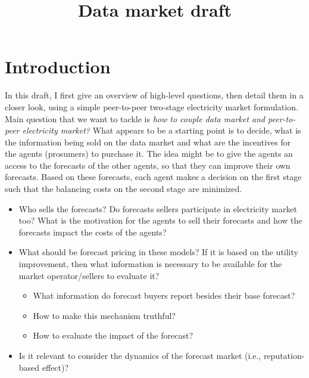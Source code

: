 \documentclass{article}
\title{Data market draft}
\begin{document}
\maketitle

\section{Introduction}
In this draft, I first give an overview of high-level questions, then detail them in a closer look, using a simple peer-to-peer two-stage electricity market formulation. Main question that we want to tackle is \emph{how to couple data market and peer-to-peer electricity market?} What appears to be a starting point is to decide, what is the information being sold on the data market and what are the incentives for the agents (prosumers) to purchase it. The idea might be to give the agents an access to the forecasts of the other agents, so that they can improve their own forecasts. Based on these forecasts, each agent makes a decision on the first stage such that the balancing costs on the second stage are minimized. 

\begin{itemize}
    \item Who sells the forecasts? Do forecasts sellers participate in electricity market too? What is the motivation for the agents to sell their forecasts and how the forecasts impact the costs of the agents?
    
    \item What should be forecast pricing in these models? If it is based on the utility improvement, then what information is necessary to be available for the market operator/sellers to evaluate it? 
    \begin{itemize}
        \item What information do forecast buyers report besides their base forecast?
        
        \item How to make this mechanism truthful?
        
        \item How to evaluate the impact of the forecast? 
    \end{itemize}
    
    \item Is it relevant to consider the dynamics of the forecast market (i.e., reputation-based effect)?
\end{itemize}
\end{document}
